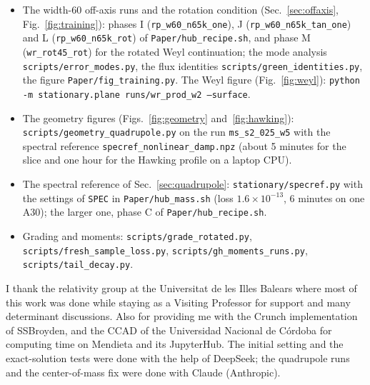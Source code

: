 \documentclass[aps,prd,twocolumn,superscriptaddress, nofootinbib,floatfix]{revtex4-2}
\begin{document}
\begin{itemize}
The mass against $S_2$ (Table~\ref{tab:mass}), \texttt{Paper/hub\_mass.sh}: the networks \texttt{ms\_s2h\_*} ($S_2=-1/24$) and \texttt{ms\_s2d\_*} ($-1/6$), and the spectral reference of each amplitude (\texttt{specref\_nonlinear\_fine} in the run directory; \texttt{Paper/commands\_specref.sh} for its settings, 35--40 minutes each).
The hard end: the networks \texttt{ms\_s2\_025\_*} and \texttt{ms\_s2\_030\_*} continued by \texttt{Paper/hub\_hard2.sh}, at width 40 with 32768 points \texttt{Paper/hub\_hard3.sh} (\texttt{*\_b40\_*}) and with 65536 points \texttt{Paper/hub\_recipe.sh} (\texttt{hs\_*}, Table~\ref{tab:mass}); the spectral references with the damped step of \texttt{stationary/specref.py}, \texttt{Paper/hub\_hardref.sh} ($-1/4$, tag \texttt{damp}) and \texttt{Paper/hub\_bigref.sh} ($-0.30$, tag \texttt{big\_l20}; 12--40 minutes per Newton step on one A30, 6\,GB of device memory).
\item The width-60 off-axis runs and the rotation condition (Sec.~\ref{sec:offaxis}, Fig.~\ref{fig:training}): phases I (\texttt{rp\_w60\_n65k\_one}), J (\texttt{rp\_w60\_n65k\_tan\_one}) and L (\texttt{rp\_w60\_n65k\_rot}) of \texttt{Paper/hub\_recipe.sh}, and phase M (\texttt{wr\_rot45\_rot}) for the rotated Weyl continuation; the mode analysis \texttt{scripts/error\_modes.py}, the flux identities \texttt{scripts/green\_identities.py}, the figure \texttt{Paper/fig\_training.py}.
The Weyl figure (Fig.~\ref{fig:weyl}): \texttt{python -m stationary.plane runs/wr\_prod\_w2 --surface}.
\item The geometry figures (Figs.~\ref{fig:geometry} and~\ref{fig:hawking}): \texttt{scripts/geometry\_quadrupole.py} on the run \texttt{ms\_s2\_025\_w5} with the spectral reference \texttt{specref\_nonlinear\_damp.npz} (about 5 minutes for the slice and one hour for the Hawking profile on a laptop CPU).
\item The spectral reference of Sec.~\ref{sec:quadrupole}: \texttt{stationary/specref.py} with the settings of \texttt{SPEC} in \texttt{Paper/hub\_mass.sh} (loss $1.6\times10^{-13}$, 6 minutes on one A30); the larger one, phase C of \texttt{Paper/hub\_recipe.sh}.
\item Grading and moments: \texttt{scripts/grade\_rotated.py}, \texttt{scripts/fresh\_sample\_loss.py}, \texttt{scripts/gh\_moments\_runs.py}, \texttt{scripts/tail\_decay.py}.
\end{itemize}

\begin{acknowledgments}
I thank the relativity group at the Universitat de les Illes Balears where most of this work was done while staying as a Visiting Professor for support and many determinant discussions. Also for providing me with the Crunch implementation of SSBroyden, and the CCAD of the Universidad Nacional de C\'ordoba for computing time on Mendieta and its JupyterHub.
The initial setting and the exact-solution tests were done with the help of DeepSeek; the quadrupole runs and the center-of-mass fix were done with Claude (Anthropic).
\end{acknowledgments}


\end{document}

